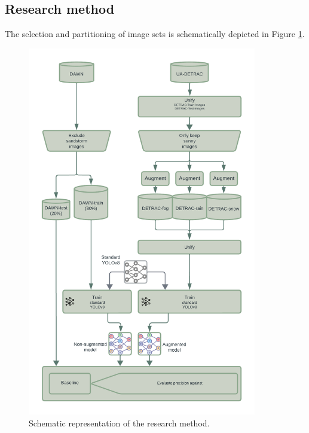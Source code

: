 \documentclass[]{article}
\begin{document}
\begin{appendices}
	\section{Research method}
	
	The selection and partitioning of image sets is schematically depicted in Figure \ref{fig:schema}.
	
	\begin{figure}[H]
		\centering
		\includegraphics[width=100mm]{Proposal_diagram.png}
		\caption{Schematic representation of the research method.}
		\label{fig:schema}
	\end{figure}
	
\end{appendices}


\printbibliography
\end{document}
